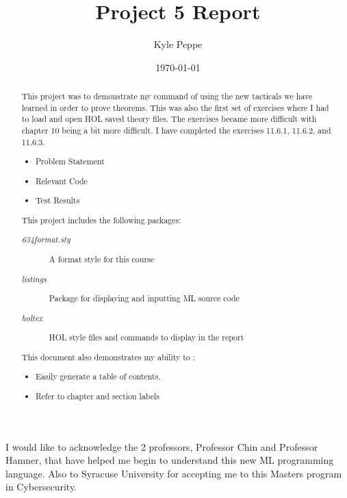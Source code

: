 \documentclass{report}
\title{Project 5 Report}
\author{Kyle Peppe}
\date{\today}
\begin{document}
\lstset{language=ML}


\maketitle{}

\begin{abstract}
  This project was to demonstrate my command of using the new
  tacticals we have learned in order to prove theorems. This was also
  the first set of exercises where I had to load and open HOL saved
  theory files. The exercises became more difficult with chapter 10
  being a bit more difficult. I have completed the exercises 11.6.1,
  11.6.2, and 11.6.3.
	\begin{itemize}
		\item Problem Statement
		\item Relevant Code
		\item Test Results
	\end{itemize}
        This project includes the following packages:
	\begin{description}
		\item[\emph{634format.sty}] A format style for this course
		\item[\emph{listings}] Package for displaying and inputting ML source code
		\item[\emph{holtex}] HOL style files and commands to display in the report
	\end{description}
        This document also demonstrates my ability to :
	\begin{itemize}
		\item Easily generate a table of contents,
		\item Refer to chapter and section labels
	\end{itemize}
\end{abstract}

\tableofcontents{}

\begin{acknowledgments}
  I would like to acknowledge the 2 professors, Professor Chin and 
  Professor Hamner, that have helped me begin to understand this new
  ML programming language. Also to Syracuse University for accepting
  me to this Masters program in Cybersecurity.
\end{acknowledgments}
\end{document}
